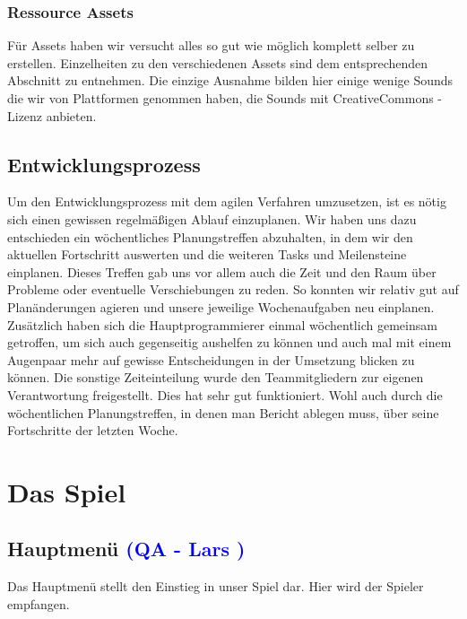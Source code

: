 \documentclass[12pt]{article}
\begin{document}
\subsubsection{Ressource Assets}
Für Assets haben wir versucht alles so gut wie möglich komplett selber zu erstellen. Einzelheiten zu den verschiedenen Assets sind dem entsprechenden Abschnitt zu entnehmen.
Die einzige Ausnahme bilden hier einige wenige Sounds die wir von Plattformen genommen haben, die Sounds mit CreativeCommons - Lizenz anbieten. 

\vspace{2cm}
\subsection{Entwicklungsprozess}
Um den Entwicklungsprozess mit dem agilen Verfahren umzusetzen, ist es nötig sich einen gewissen regelmäßigen Ablauf einzuplanen. \newline
Wir haben uns dazu entschieden ein wöchentliches Planungstreffen abzuhalten,
in dem wir den aktuellen Fortschritt auswerten und die weiteren Tasks und Meilensteine einplanen. Dieses Treffen gab uns vor allem auch die Zeit und den Raum über Probleme oder eventuelle Verschiebungen zu reden. So konnten wir relativ gut auf Planänderungen agieren und unsere jeweilige Wochenaufgaben neu einplanen. \newline
Zusätzlich haben sich die Hauptprogrammierer einmal wöchentlich gemeinsam getroffen, um sich auch gegenseitig aushelfen zu können und auch mal mit einem Augenpaar mehr auf gewisse Entscheidungen in der Umsetzung blicken zu können.
Die sonstige Zeiteinteilung wurde den Teammitgliedern zur eigenen Verantwortung freigestellt. Dies hat sehr gut funktioniert. Wohl auch durch die wöchentlichen Planungstreffen, in denen man Bericht ablegen muss, über seine Fortschritte der letzten Woche.

\newpage
\section{Das Spiel}

\vspace{2cm}
\subsection{Hauptmenü \textcolor{blue}{(QA - Lars )}}

Das Hauptmenü stellt den Einstieg in unser Spiel dar. Hier wird der Spieler empfangen.
\end{document}
